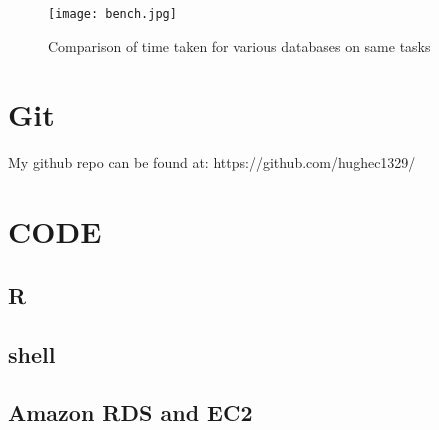 \documentclass[12pt]{article}
\begin{document}
		\begin{figure}[h!]
			\centering
			\texttt{[image: bench.jpg]}
			\caption{Comparison of time taken for various databases on same tasks}
		\end{figure}
	\section{Git}
		My github repo can be found at: https://github.com/hughec1329/

\newpage
	\section{CODE}
	\subsection{R}
		
	\subsection{shell}
		
		
	\subsection{Amazon RDS and EC2}
\end{document}
